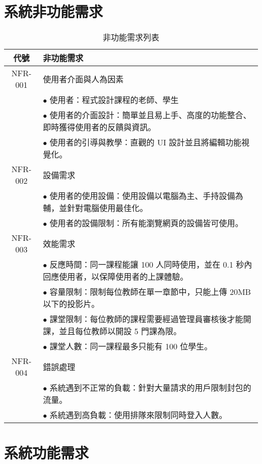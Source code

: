 \documentclass[12pt]{article}
\begin{document}
\section{系統非功能需求}
\begin{table}[H]
  \centering
  \begin{tabular}{|c|p{14.5cm}|}
    \hline
    \textbf{代號} & \textbf{非功能需求} \\
    \hline
    NFR-001 & 使用者介面與人為因素 \\ 
    & $\bullet$ 使用者：程式設計課程的老師、學生 \\
    & $\bullet$ 使用者的介面設計：簡單並且易上手、高度的功能整合、即時獲得使用者的反饋與資訊。 \\
    & $\bullet$ 使用者的引導與教學：直觀的 UI 設計並且將編輯功能視覺化。\\
    \hline
    NFR-002 & 設備需求 \\
    & $\bullet$ 使用者的使用設備：使用設備以電腦為主、手持設備為輔，並針對電腦使用最佳化。\\
    & $\bullet$ 使用者的設備限制：所有能瀏覽網頁的設備皆可使用。\\
    \hline
    NFR-003 & 效能需求 \\
    & $\bullet$ 反應時間：同一課程能讓 100 人同時使用，並在 0.1 秒內回應使用者，以保障使用者的上課體驗。\\
    & $\bullet$ 容量限制：限制每位教師在單一章節中，只能上傳 20MB 以下的投影片。\\
    & $\bullet$ 課堂限制：每位教師的課程需要經過管理員審核後才能開課，並且每位教師以開設 5 門課為限。\\
    & $\bullet$ 課堂人數：同一課程最多只能有 100 位學生。\\
    \hline
    NFR-004 & 錯誤處理 \\
    & $\bullet$ 系統遇到不正常的負載：針對大量請求的用戶限制封包的流量。\\
    & $\bullet$ 系統遇到高負載：使用排隊來限制同時登入人數。\\
    \hline
  \end{tabular}
  \caption{非功能需求列表}
\end{table}

\section{系統功能需求}
\end{document}
